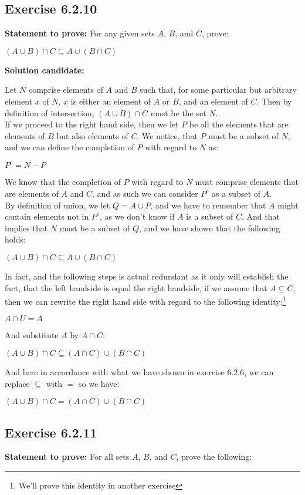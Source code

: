 \documentclass{report}
\newcommand{\cent}[1]{\begin{center}#1\end{center}}
\newcommand{\Prove}{\textbf{Statement to prove: }}
\newcommand{\Solution}{\textbf{Solution candidate: }}
\newcommand{\QED}{\boxed{}}
\newcommand{\Exercise}[1]{\subsection{Exercise #1}}
\begin{document}
	\Exercise{6.2.10}
	
	\Prove
	For any given sets $A$, $B$, and $C$, prove:
	
	\cent{$(A \cup B) \cap C \subseteq A \cup (B \cap C)$}
	
	\Solution
	
	Let $N$ comprise elements of $A$ and $B$ such that, for some particular but arbitrary element $x$ of $N$, $x$ is either an element of $A$ or $B$, and an element of $C$. Then by definition of intersection, $(A \cup B) \cap C$ must be the set $N$. \\
	
	If we proceed to the right hand side, then we let $P$ be all the elements that are elements of $B$ but also elements of $C$. We notice, that $P$ must  be a subset of $N$, and we can define the completion of $P$ with regard to $N$ as:
	
	\cent{$P^c = N - P$}
	
	We know that the completion of $P$ with regard to $N$ must comprise elements that are elements of $A$ and $C$, and as such we can consider $P^c$ as a subset of $A$.\\
	
	By definition of union, we let $Q = A \cup P$, and we have to remember that $A$ might contain elements not in $P^c$, as we don't know if $A$ is a subset of $C$. And that implies that $N$ must be a subset of $Q$, and we have shown that the following holds:
	
	\cent{$(A \cup B) \cap C \subseteq A \cup (B \cap C)$}
	
	In fact, and the following steps is actual  redundant as it only will establish the fact, that the left handside is equal the right handside, if we assume that  $A \subseteq C$, then we can rewrite the right hand side with regard to the following identity:\footnote{We'll prove this identity in another exercise}
	
	\cent{$A \cap U = A$}
	
	And substitute $A$ by $A \cap C$:
	
	\cent{$(A \cup B) \cap C \subseteq (A \cap C) \cup (B \cap C)$}
	
	And here in accordance with what we have shown in exercise 6.2.6,  we can replace $\subseteq$ with $=$ so we have:
	\cent{$(A \cup B) \cap C = (A \cap C) \cup (B \cap C)$}
	\QED
	
	\Exercise{6.2.11}
	
	\Prove
	For all sets $A$, $B$, and $C$, prove the following:
	
\end{document}
